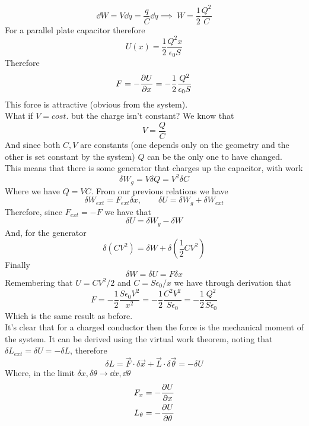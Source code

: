 \documentclass[../electromagnetism]{subfiles}
\begin{document}
\begin{equation*}
	\dd W=V\dd q=\frac{q}{C}\dd q\implies\ W=\frac{1}{2}\frac{Q^2}{C}
\end{equation*}
For a parallel plate capacitor therefore
\begin{equation*}
	U(x)=\frac{1}{2}\frac{Q^2x}{\epsilon_0S}
\end{equation*}
Therefore
\begin{equation*}
	F=-\pdv{U}{x}=-\frac{1}{2}\frac{Q^2}{\epsilon_0S}
\end{equation*}
This force is attractive (obvious from the system).\\
What if $V=cost.$ but the charge isn't constant? We know that
\begin{equation*}
	V=\frac{Q}{C}
\end{equation*}
And since both $C,V$ are constants (one depends only on the geometry and the other is set constant by the system) $Q$ can be the only one to have changed.\\
This means that there is some generator that charges up the capacitor, with work
\begin{equation*}
	\delta W_g=V\delta Q=V^2\delta C
\end{equation*}
Where we have $Q=VC$. From our previous relations we have
\begin{equation*}
	\delta W_{ext}=F_{ext}\delta x,\qquad\delta U=\delta W_g+\delta W_{ext}
\end{equation*}
Therefore, since $F_{ext}=-F$ we have that
\begin{equation*}
	\delta U=\delta W_g-\delta W
\end{equation*}
And, for the generator
\begin{equation*}
	\delta(CV^2)=\delta W+\delta\left( \frac{1}{2}CV^2 \right)
\end{equation*}
Finally
\begin{equation*}
	\delta W=\delta U=F\delta x
\end{equation*}
Remembering that $U=CV^2/2$ and $C=S\epsilon_0/x$ we have through derivation that
\begin{equation*}
	F=-\frac{1}{2}\frac{S\epsilon_0 V^2}{x^2}=-\frac{1}{2}\frac{C^2V^2}{S\epsilon_0}=-\frac{1}{2}\frac{Q^2}{S\epsilon_0}
\end{equation*}
Which is the same result as before.\\
It's clear that for a charged conductor then the force is the mechanical moment of the system. It can be derived using the virtual work theorem, noting that $\delta L_{ext}=\delta U=-\delta L$, therefore
\begin{equation*}
	\delta L=\vec{F}\cdot\delta\vec{x}+\vec{L}\cdot\delta\vec{\theta}=-\delta U
\end{equation*}
Where, in the limit $\delta x,\delta \theta\to\dd x,\dd\theta$
\begin{equation*}
	\begin{aligned}
		F_x&=-\pdv{U}{x}\\
		L_\theta&=-\pdv{U}{\theta}
	\end{aligned}
\end{equation*}
\end{document}
